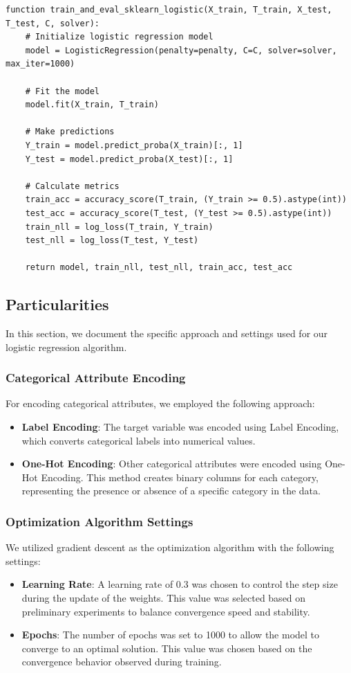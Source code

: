 \documentclass[a4paper,12pt]{article}
\begin{document}
\begin{verbatim}
function train_and_eval_sklearn_logistic(X_train, T_train, X_test, T_test, C, solver):
    # Initialize logistic regression model
    model = LogisticRegression(penalty=penalty, C=C, solver=solver, max_iter=1000)

    # Fit the model
    model.fit(X_train, T_train)

    # Make predictions
    Y_train = model.predict_proba(X_train)[:, 1]
    Y_test = model.predict_proba(X_test)[:, 1]

    # Calculate metrics
    train_acc = accuracy_score(T_train, (Y_train >= 0.5).astype(int))
    test_acc = accuracy_score(T_test, (Y_test >= 0.5).astype(int))
    train_nll = log_loss(T_train, Y_train)
    test_nll = log_loss(T_test, Y_test)

    return model, train_nll, test_nll, train_acc, test_acc
\end{verbatim}

\subsection{Particularities}

In this section, we document the specific approach and settings used for our logistic regression algorithm.

\subsubsection{Categorical Attribute Encoding}
For encoding categorical attributes, we employed the following approach:
\begin{itemize}
    \item \textbf{Label Encoding}: The target variable was encoded using Label Encoding, which converts categorical labels into numerical values.
    \item \textbf{One-Hot Encoding}: Other categorical attributes were encoded using One-Hot Encoding. This method creates binary columns for each category, representing the presence or absence of a specific category in the data.
\end{itemize}

\subsubsection{Optimization Algorithm Settings}
We utilized gradient descent as the optimization algorithm with the following settings:
\begin{itemize}
    \item \textbf{Learning Rate}: A learning rate of 0.3 was chosen to control the step size during the update of the weights. This value was selected based on preliminary experiments to balance convergence speed and stability.
    \item \textbf{Epochs}: The number of epochs was set to 1000 to allow the model to converge to an optimal solution. This value was chosen based on the convergence behavior observed during training.
\end{itemize}
\newpage
\end{document}
